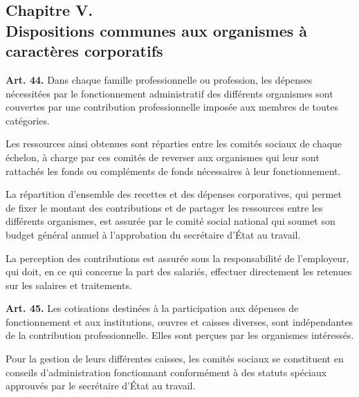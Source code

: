 \documentclass[french,twoside]{book} %
\newcommand{\labelchar}[1]{\textbf{\color{rubric} #1}}
\def\mednobreak{\ifdim\lastskip<\medskipamount
  \removelastskip\nopagebreak\medskip\fi}
\newcommand{\labelblock}[1]{\medbreak{\noindent\color{rubric}\bfseries #1}\par\mednobreak}
\begin{document}
\subsection[Chapitre V. Dispositions communes aux organismes à caractères corporatifs]{Chapitre V. \\
Dispositions communes aux organismes à caractères corporatifs}
\noindent \labelchar{Art. 44.} Dans chaque famille professionnelle ou profession, les dépenses nécessitées par le fonctionnement administratif des différents organismes sont couvertes par une contribution professionnelle imposée aux membres de toutes catégories.\par
Les ressources ainsi obtenues sont réparties entre les comités sociaux de chaque échelon, à charge par ces comités de reverser aux organismes qui leur sont rattachés les fonds ou compléments de fonds nécessaires à leur fonctionnement.\par
La répartition d’ensemble des recettes et des dépenses corporatives, qui permet de fixer le montant des contributions et de partager les ressources entre les différents organismes, est assurée par le comité social national qui soumet son budget général annuel à l’approbation du secrétaire d’État au travail.\par
La perception des contributions est assurée sous la responsabilité de l’employeur, qui doit, en ce qui concerne la part des salariés, effectuer directement les retenues sur les salaires et traitements.\par
\bigbreak
\noindent \labelchar{Art. 45.} Les cotisations destinées à la participation aux dépenses de fonctionnement et aux institutions, œuvres et caisses diverses, sont indépendantes de la contribution professionnelle. Elles sont perçues par les organismes intéressés.\par
Pour la gestion de leurs différentes caisses, les comités sociaux se constituent en conseils d’administration fonctionnant conformément à des statuts spéciaux approuvés par le secrétaire d’État au travail.\par

\labelblock{Le patrimoine corporatif commun}
\end{document}
